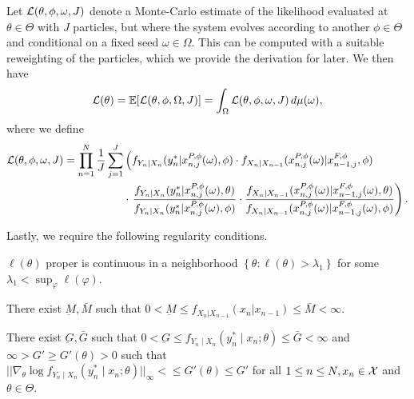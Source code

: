 \documentclass{article}
\begin{document}
\begin{defn}
\label{defn:doubly-off-policy}
Let $\mathcal{L}(\theta, \phi, \omega, J)$ denote a Monte-Carlo estimate of the likelihood evaluated at $\theta \in \Theta$ with $J$ particles, but where the system evolves according to another $\phi \in \Theta$ and conditional on a fixed seed $\omega \in \Omega$. This can be computed with a suitable reweighting of the particles, which we provide the derivation for later. We then have
\begin{equation} \label{eq:loglik2}
\mathcal{L}(\theta)=\mathbb{E}[\mathcal{L}(\theta,\phi,\Omega, J)]=\int_\Omega \mathcal{L}(\theta,\phi,\omega, J)\, d\mu(\omega),
\end{equation}
where we define
\begin{align}
    \mathcal{L}(\theta,\phi,\omega, J) = \prod_{n=1}^N \frac{1}{J} \sum_{j=1}^J &\left(f_{Y_n|X_n}(y_n^* | x_{n,j}^{P,\phi}(\omega), \phi) \cdot 
    f_{X_n|X_{n-1}}(x_{n,j}^{P, \phi}(\omega) | x_{n-1,j}^{F,\phi}, \phi) \right.\\
    &\cdot
    \left.
    \frac{f_{Y_n|X_n}(y^*_n|x_{n,j}^{P,\phi}(\omega),\theta)}{f_{Y_n|X_n}(y^*_n|x_{n,j}^{P,\phi}(\omega),\phi)}
    \cdot \frac{f_{X_n|X_{n-1}}(x_{n,j}^{P,\phi}(\omega)|x_{n-1,j}^{F,\phi}(\omega),\theta)}{f_{X_n|X_{n-1}}(x_{n,j}^{P,\phi}(\omega)|x_{n-1,j}^{F,\phi}(\omega),\phi)}\right).
\end{align}
\end{defn}

Lastly, we require the following regularity conditions.

\begin{aspt} $\ell(\theta)$ proper is continuous in a neighborhood $\left\{\theta: \ell(\theta)>\lambda_1\right\}$ for some $\lambda_1<\sup _{\varphi} \ell(\varphi)$.
\end{aspt}

\begin{aspt}
\label{assump:bounded-process}
    There exist $\underbar{M}, \bar{M}$ such that $0 < \underbar{M} \leq f_{X_n|X_{n-1}}(x_n | x_{n-1}) \leq \bar{M} < \infty$. 
\end{aspt}


\begin{aspt}
\label{assump:bounded-measurement}
There exist $\underbar{G}, \bar{G}$ such that $0<\underbar{G} \leq f_{Y_n \mid X_n}\left(y_n^* \mid x_n; \theta\right) \leq \bar{G} < \infty$ and $\infty > G' \geq G'(\theta)>0$ such that $||\nabla_\theta \log f_{Y_n \mid X_n}\left(y_n^* \mid x_n; \theta\right)||_\infty <\leq G'(\theta) \leq G'$ for all $1 \leq n \leq N, x_n \in {\mathcal{X}}$ and $\theta \in \Theta.$
\end{aspt}
\end{document}
